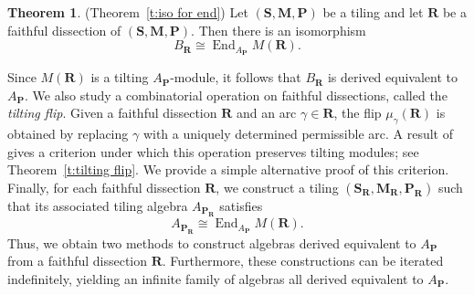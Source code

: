 \documentclass[a4paper,10pt]{amsart}
\theoremstyle{plain}          %
\theoremstyle{definition}
\newtheorem{thm}[theorem]{Theorem}
\def\SS{\mathbf{S}}
\def\RR{\mathbf{R}}
\def\MM{\mathbf{M}}
\def\PP{\mathbf{P}}
\def\MM{\mathbf{M}}
\newcommand{\apfree}{\angle^-_{\mathbf{P-free}}}
\newcommand{\End}{\operatorname{End}\nolimits}
\newcommand{\ie}{{\em i.e.}\ }
\begin{document}

\begin{thm}\label{t:main result}(Theorem~\ref{t:iso for end})
    Let $(\SS,\MM,\PP)$ be a tiling and let $\mathbf{R}$ be a faithful dissection of $(\SS,\MM,\PP)$. Then there is an isomorphism $$B_{\RR}\cong \End_{A_{\PP}}M(\mathbf{R}).$$
\end{thm}


Since $M(\RR)$ is a tilting $A_{\PP}$-module, it follows that $B_{\RR}$ is derived equivalent to $A_{\PP}$. We also study a combinatorial operation on faithful dissections, called the \emph{tilting flip}. Given a faithful dissection $\RR$ and an arc $\gamma\in\RR$, the flip $\mu_\gamma(\RR)$ is obtained by replacing $\gamma$ with a uniquely determined permissible arc. A result of \cite{Nie} gives a criterion under which this operation preserves tilting modules; see Theorem~\ref{t:tilting flip}. We provide a simple alternative proof of this criterion. Finally, for each faithful dissection $\RR$, we construct a tiling $(\SS_{\RR},\MM_{\RR},\PP_{\RR})$ such that its associated tiling algebra $A_{\PP_{\RR}}$ satisfies
\[
A_{\PP_{\RR}}\cong \End_{A_{\PP}}M(\RR).
\]
Thus, we obtain two methods to construct algebras derived equivalent to $A_\PP$ from a faithful dissection $\RR$. Furthermore, these constructions can be iterated indefinitely, yielding an infinite family of algebras all derived equivalent to $A_\PP$.


\end{document}
